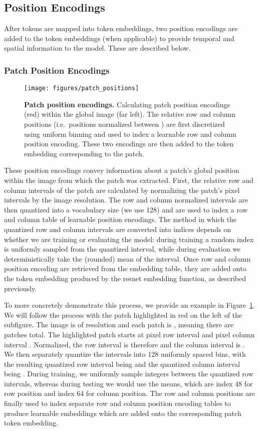 \documentclass[10pt]{article} \usepackage[accepted]{tmlr}
\begin{document}
\vskip 0.4cm
\subsection{Position Encodings}
\vskip 0.2cm
\label{sec:position_encodings}

After tokens are mapped into token embeddings, two position encodings are added to the token embeddings (when applicable) to provide temporal and spatial information to the model. These are described below.
\subsubsection*{Patch Position Encodings}
\begin{figure}[t]
    \centering
    \texttt{[image: figures/patch\_positions]}
    \caption{
    {\bf Patch position encodings.}
    Calculating patch position encodings  (red) within the global image (far left). The relative row and column positions (i.e.\ positions normalized between ) are first discretized using uniform binning and used to index a learnable row and column position encoding. These two encodings are then added to the token embedding corresponding to the patch.
    \small}
    \label{fig:pos_encs}
\end{figure}


These position encodings convey information about a patch's global position within the image from which the patch was extracted. First, the relative row and column intervals of the patch are calculated by normalizing the patch's pixel intervals by the image resolution. The row and column normalized intervals are then quantized into a vocabulary size (we use 128) and are used to index a row and column table of learnable position encodings. The method in which the quantized row and column intervals are converted into indices depends on whether we are training or evaluating the model: during training a random index is uniformly sampled from the quantized interval, while during evaluation we deterministically take the (rounded) mean of the interval. Once row and column position encoding are retrieved from the embedding table, they are added onto the token embedding produced by the resnet embedding function, as described previously.

To more concretely demonstrate this process, we provide an example in Figure~\ref{fig:pos_encs}. We will follow the process with the patch highlighted in red on the left of the subfigure. The image is of resolution  and each patch is , meaning there are  patches total. The highlighted patch starts at pixel row interval  and pixel column interval . Normalized, the row interval is therefore  and the column interval is . We then separately quantize the intervals into 128 uniformly spaced bins, with the resulting quantized row interval being  and the quantized column interval being . During training, we uniformly sample integers between the quantized row intervals, whereas during testing we would use the means, which are index 48 for row position and index 64 for column position. The row and column positions are finally used to index separate row and column position encoding tables to produce learnable embeddings which are added onto the corresponding patch token embedding.
\end{document}
